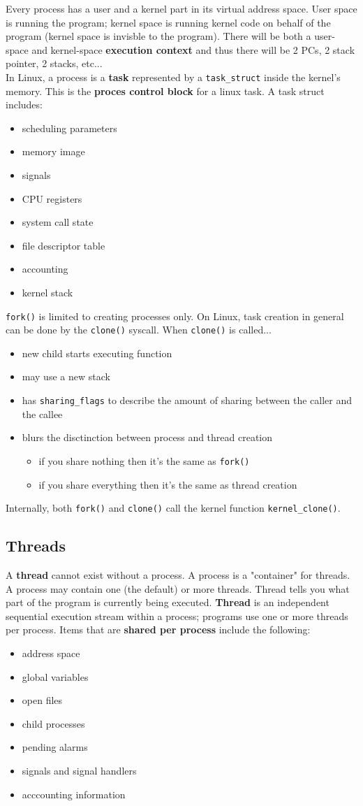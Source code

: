 \documentclass{article}
\renewcommand{\b}{\item[$\circ$]}
\newcommand{\newlist}{\begin{itemize}}
\renewcommand{\endlist}{\end{itemize}}
\begin{document}
    Every process has a user and a kernel part in its virtual address space. User space is running the program; kernel space is running kernel code on behalf of the program (kernel space is invisble to the program). There will be both a user-space and kernel-space \textbf{execution context} and thus there will be 2 PCs, 2 stack pointer, 2 stacks, etc... \\

    \noindent In Linux, a process is a \textbf{task} represented by a \texttt{task\_struct} inside the kernel's memory. This is the \textbf{proces control block} for a linux task. A task struct includes:

    \newlist
    \b scheduling parameters
    \b memory image
    \b signals
    \b CPU registers
    \b system call state
    \b file descriptor table
    \b accounting
    \b kernel stack
    \endlist

    \noindent \texttt{fork()} is limited to creating processes only. On Linux, task creation in general can be done by the \texttt{clone()} syscall. When \texttt{clone()} is called... 

    \newlist
    \b new child starts executing function
    \b may use a new stack
    \b has \texttt{sharing\_flags} to describe the amount of sharing between the caller and the callee
    \b blurs the disctinction between process and thread creation 
    \newlist
    \b if you share nothing then it's the same as \texttt{fork()}
    \b if you share everything then it's the same as thread creation
    \endlist
    \endlist

    \noindent Internally, both \texttt{fork()} and \texttt{clone()} call the kernel function \texttt{kernel\_clone()}.

\subsection{Threads}

    A \textbf{thread} cannot exist without a process. A process is a "container" for threads. A process may contain one (the default) or more threads. Thread tells you what part of the program is currently being executed. \textbf{Thread} is an independent sequential execution stream within a process; programs use one or more threads per process. Items that are \textbf{shared per process} include the following:

    \newlist
    \b address space
    \b global variables
    \b open files
    \b child processes
    \b pending alarms
    \b signals and signal handlers
    \b acccounting information
    \endlist
\end{document}
